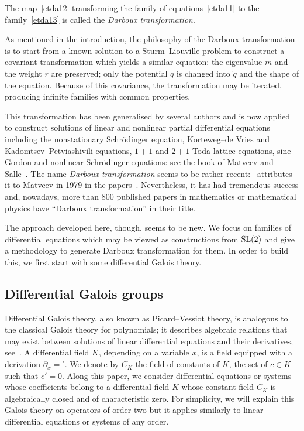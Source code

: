 \documentclass[pdftex]{sigma}%
\numberwithin{equation}{section}
\begin{document}
\begin{Definition}
The map~\eqref{etda12} transforming the family of equations~\eqref{etda11} to the family~\eqref{etda13} is called the \emph{Darboux transformation}. %
\end{Definition}

As mentioned in the introduction, the philosophy of the Darboux transformation is to start from a known-solution to a Sturm--Liouville problem to construct a covariant transformation which yields a similar equation: the eigenvalue $m$ and the weight $r$ are preserved; only the potential $q$ is changed into $\tilde{q}$ and the shape of the equation. Because of this covariance, the transformation may be iterated, producing infinite families with common properties.

This transformation has been generalised by several authors and is now applied to construct solutions of linear and nonlinear partial differential equations including the nonstationary Schr\"odinger equation, Korteweg--de Vries and Kadomtsev--Petviashivili equations, $1 + 1$ and $2+1$ Toda lattice equations,
sine-Gordon and nonlinear Schr\"odinger equations: see the book of Matveev and Salle~\cite{MaSa91a}. The name \emph{Darboux transformation} seems to be rather recent:~\cite{rosu1999short} attributes it to Matveev in 1979 in the papers~\cite{Ma79u,Ma79m,MaSa79a}. Nevertheless, it has had tremendous success and, nowadays, more than 800 published papers in mathematics or mathematical physics have ``Darboux transformation'' in their title.

The approach developed here, though, seems to be new. We focus on families of differential equations which may be viewed as constructions from ${\rm SL}(2)$ and give a methodology to generate Darboux transformation for them. In order to build this, we first start with some differential Galois theory.

\subsection{Differential Galois groups} \label{dgal-section}
Differential Galois theory, also known as Picard--Vessiot theory, is analogous to the classical Galois theory for polynomials; it describes algebraic relations that may exist between solutions of linear differential equations and their derivatives,
see~\cite{crhamo,PS}.
A differential field $K$, depending on a variable $x$, is a field equipped with a derivation $\partial_x={}'$. We denote by $C_K$ the field of constants of $K$, the set of $c\in K$ such that $c'=0$. Along this
paper, we consider differential equations or systems whose coefficients belong
to a differential field $K$ whose constant field $C_K$ is algebraically closed and of characteristic zero.
For simplicity, we will explain this Galois theory on operators of order two but it applies similarly to linear differential equations or systems of any order.
\end{document}
